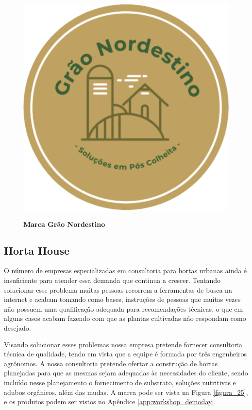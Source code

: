 \begin{figure}[H]
\centering
\caption{\textbf{Marca Grão Nordestino}}
\includegraphics[scale=0.4]{Imagens/graonordestino.png}
\label{figura_21}
\end{figure}

\subsection{Horta House}


O número de empresas especializadas em consultoria para hortas urbanas ainda é insuficiente para atender essa demanda que continua a crescer. Tentando solucionar esse problema muitas pessoas recorrem a ferramentas de busca na internet e acabam tomando como bases, instruções de pessoas que muitas vezes não possuem uma qualificação adequada para recomendações técnicas, o que em alguns casos acabam fazendo com que as plantas cultivadas não respondam como desejado.


Visando solucionar esses problemas nossa empresa pretende fornecer consultoria técnica de qualidade, tendo em vista que a equipe é formada por três engenheiros agrônomos. A nossa consultoria pretende ofertar a construção de hortas planejadas para que as mesmas sejam adequadas às necessidades do cliente, sendo incluído nesse planejamento o fornecimento de substrato, soluções nutritivas e adubos orgânicos, além das mudas. A marca pode ser vista na Figura \ref{figura_25}, e os produtos podem ser vistos no Apêndice \ref{app:workshop_demoday}.


